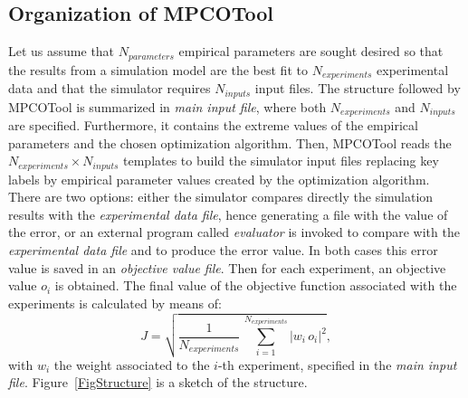 \documentclass[review,authoryear]{elsarticle}
\newcommand{\EQ}[2]
{\begin{equation}#1\label{#2}\end{equation}}
\newcommand{\PSPICTURE}[7]
{
	\begin{figure}[ht!]
		\centering
		\pspicture(#1,#2)(#3,#4)
			#5
		\endpspicture
		\caption{#6.\label{#7}}
	\end{figure}
}
\newcommand{\ABS}[1]{\left|#1\right|}
\begin{document}
\subsection{Organization of MPCOTool}

Let us assume that $N_{parameters}$ empirical parameters are sought desired so
that the results from a simulation model are the best fit to $N_{experiments}$
experimental data and that the simulator requires $N_{inputs}$ input files. The
structure followed by MPCOTool is summarized in \emph{main input file},
where both $N_{experiments}$ and $N_{inputs}$ are specified. Furthermore, it
contains the extreme values of the empirical parameters and the chosen
optimization algorithm. Then, MPCOTool reads the
$N_{experiments}\times N_{inputs}$ templates to build the simulator input files
replacing key labels by empirical parameter values created by the optimization
algorithm. There are two options: either the simulator compares directly the
simulation results with the \emph{experimental data file}, hence generating a
file with the value of the error, or an external program called \emph{evaluator}
is invoked to compare with the \emph{experimental data file} and to produce the
error value. In both cases this error value is saved in an
\emph{objective value file}. Then for each experiment, an objective value $o_i$
is obtained. The final value of the objective function associated with the
experiments is calculated by means of:
\EQ
{
	J=\sqrt{\frac{1}{N_{experiments}}
	\,\sum_{i=1}^{N_{experiments}}\ABS{w_i\,o_i}^2},
}{EqObjectiveFunction}
with $w_i$ the weight associated to the $i$-th experiment, specified in the
\emph{main input file}. Figure~\ref{FigStructure} is a sketch of the
structure.
\end{document}
